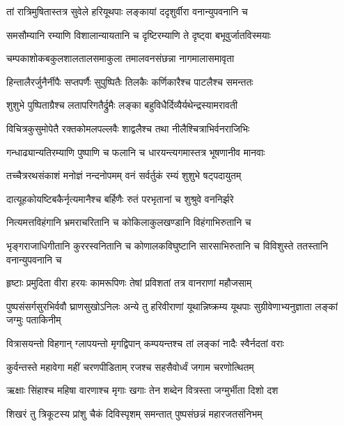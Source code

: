 
\twolineshloka
{तां रात्रिमुषितास्तत्र सुवेले हरियूथपाः}
{लङ्कायां ददृशुर्वीरा वनान्युपवनानि च} %

\twolineshloka
{समसौम्यानि रम्याणि विशालान्यायतानि च}
{दृष्टिरम्याणि ते दृष्ट्वा बभूवुर्जातविस्मयाः} %

\twolineshloka
{चम्पकाशोकबकुलशालतालसमाकुला}
{तमालवनसंछन्ना नागमालासमावृता} %

\twolineshloka
{हिन्तालैरर्जुनैर्नीपैः सप्तपर्णैः सुपुष्पितैः}
{तिलकैः कर्णिकारैश्च पाटलैश्च समन्ततः} %

\twolineshloka
{शुशुभे पुष्पिताग्रैश्च लतापरिगतैर्द्रुमैः}
{लङ्का बहुविधैर्दिव्यैर्यथेन्द्रस्यामरावती} %

\twolineshloka
{विचित्रकुसुमोपेतै रक्तकोमलपल्लवैः}
{शाद्वलैश्च तथा नीलैश्चित्राभिर्वनराजिभिः} %

\twolineshloka
{गन्धाढ्यान्यतिरम्याणि पुष्पाणि च फलानि च}
{धारयन्त्यगमास्तत्र भूषणानीव मानवाः} %

\twolineshloka
{तच्चैत्ररथसंकाशं मनोज्ञं नन्दनोपमम्}
{वनं सर्वर्तुकं रम्यं शुशुभे षट्पदायुतम्} %

\twolineshloka
{दात्यूहकोयष्टिबकैर्नृत्यमानैश्च बर्हिणैः}
{रुतं परभृतानां च शुश्रुवे वननिर्झरे} %

\twolineshloka
{नित्यमत्तविहंगानि भ्रमराचरितानि च}
{कोकिलाकुलखण्डानि विहंगाभिरुतानि च} %

\threelineshloka
{भृङ्गराजाधिगीतानि कुररस्वनितानि च}
{कोणालकविघुष्टानि सारसाभिरुतानि च}
{विविशुस्ते ततस्तानि वनान्युपवनानि च} %

\twolineshloka
{हृष्टाः प्रमुदिता वीरा हरयः कामरूपिणः}
{तेषां प्रविशतां तत्र वानराणां महौजसाम्} %

\threelineshloka
{पुष्पसंसर्गसुरभिर्ववौ घ्राणसुखोऽनिलः}
{अन्ये तु हरिवीराणां यूथान्निष्क्रम्य यूथपाः}
{सुग्रीवेणाभ्यनुज्ञाता लङ्कां जग्मुः पताकिनीम्} %

\twolineshloka
{वित्रासयन्तो विहगान् ग्लापयन्तो मृगद्विपान्}
{कम्पयन्तश्च तां लङ्कां नादैः स्वैर्नदतां वराः} %

\twolineshloka
{कुर्वन्तस्ते महावेगा महीं चरणपीडिताम्}
{रजश्च सहसैवोर्ध्वं जगाम चरणोत्थितम्} %

\twolineshloka
{ऋक्षाः सिंहाश्च महिषा वारणाश्च मृगाः खगाः}
{तेन शब्देन वित्रस्ता जग्मुर्भीता दिशो दश} %

\twolineshloka
{शिखरं तु त्रिकूटस्य प्रांशु चैकं दिविस्पृशम्}
{समन्तात् पुष्पसंछन्नं महारजतसंनिभम्} %

